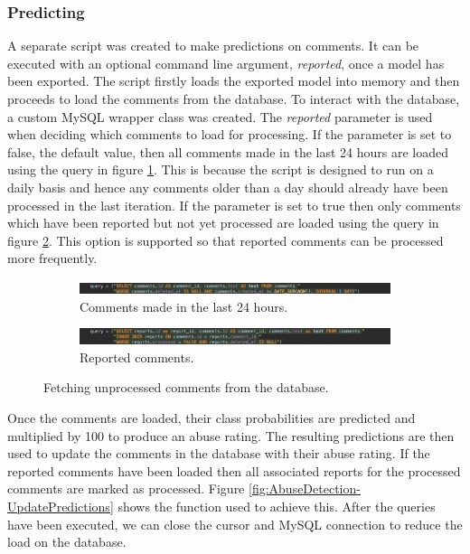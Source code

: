\subsubsection{Predicting}
A separate script was created to make predictions on comments. It can be executed with an optional command line argument, \textit{reported}, once a model has been exported. The script firstly loads the exported model into memory and then proceeds to load the comments from the database. To interact with the database, a custom MySQL wrapper class was created. The \textit{reported} parameter is used when deciding which comments to load for processing. If the parameter is set to false, the default value, then all comments made in the last 24 hours are loaded using the query in figure \ref{fig:AbuseDetection-DailyComments}. This is because the script is designed to run on a daily basis and hence any comments older than a day should already have been processed in the last iteration. If the parameter is set to true then only comments which have been reported but not yet processed are loaded using the query in figure \ref{fig:AbuseDetection-ReportedComments}. This option is supported so that reported comments can be processed more frequently.
\begin{figure}[H]
    \centering
    \begin{subfigure}[t]{\linewidth}
        \centering
        \includegraphics[width=\linewidth]{Images/Implementation/DataProcessing/AbuseDetection/DailyCommentsQuery}
        \caption{Comments made in the last 24 hours.}\label{fig:AbuseDetection-DailyComments}        
    \end{subfigure}
    \quad
    \begin{subfigure}[t]{\linewidth}
        \centering
        \includegraphics[width=\linewidth]{Images/Implementation/DataProcessing/AbuseDetection/ReportedCommentsQuery}
        \caption{Reported comments.}\label{fig:AbuseDetection-ReportedComments}
    \end{subfigure}
    \caption{Fetching unprocessed comments from the database.}\label{fig:AbuseDetection-LoadingComments}
\end{figure}

Once the comments are loaded, their class probabilities are predicted and multiplied by 100 to produce an abuse rating. The resulting predictions are then used to update the comments in the database with their abuse rating. If the reported comments have been loaded then all associated reports for the processed comments are marked as processed. Figure \ref{fig:AbuseDetection-UpdatePredictions} shows the function used to achieve this. After the queries have been executed, we can close the cursor and MySQL connection to reduce the load on the database.

